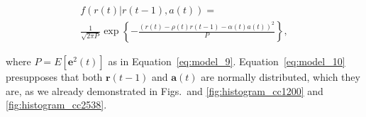 \begin{small}
\begin{align}
    \label{eq:model_10}
    f \left ( r(t)|r(t-1),a(t) \right )  =   \nonumber \\
    \frac{1}{\sqrt{2 \pi P}}  \exp \left \{- \frac{\left ( r(t) - \rho(t) r(t-1) - \alpha(t) a(t) \right)^2}{P} \right \},
\end{align}
\end{small}
where $P = E \left [ \mathbf{e}^2(t) \right ]$ as in Equation~\ref{eq:model_9}. Equation~\ref{eq:model_10} presupposes that both $\mathbf{r}(t-1)$ and $\mathbf{a}(t)$ are normally distributed, which they are, as we already demonstrated in Figs.~and \ref{fig:histogram_cc1200} and \ref{fig:histogram_cc2538}.